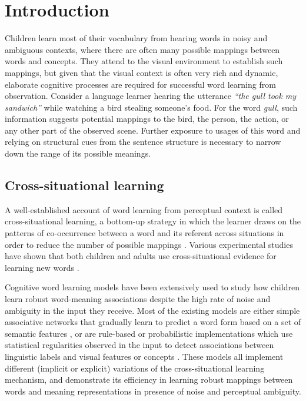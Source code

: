 \section{Introduction}

Children learn most of their vocabulary from hearing words in noisy
and ambiguous contexts, where there are often many possible mappings
between words and concepts. They attend to the visual environment to
establish such mappings, but given that the visual context is often
very rich and dynamic, elaborate cognitive processes are required for
successful word learning from observation. Consider a language learner
hearing the utterance {\it ``the gull took my sandwich''} while
watching a bird stealing someone's food. For the word {\it gull}, such
information suggests potential mappings to the bird, the person, the
action, or any other part of the observed scene. Further exposure to
usages of this word and relying on structural cues from the sentence structure
is necessary to narrow down the range of its possible meanings.

\subsection{Cross-situational learning}
A well-established account of word learning from perceptual context is
called cross-situational learning, a bottom-up strategy in which the
learner draws on the patterns of co-occurrence between a word and its
referent across situations in order to reduce the number of possible
mappings \citep{Quine1960,Carey1978,pinker.89}. Various experimental
studies have shown that both children and adults use cross-situational
evidence for learning new words
\citep{yu.smith.07,smith.yu.08,vouloumanos.08,vouloumanos.werker.09}.

Cognitive word learning models have been extensively used to study how
children learn robust word-meaning associations despite the high rate
of noise and ambiguity in the input they receive. Most of the existing
models are either simple associative networks that gradually learn to
predict a word form based on a set of semantic features
\citep{Li.etal.2004,regier.05}, or are rule-based or
probabilistic implementations which use statistical regularities
observed in the input to detect associations between linguistic labels
and visual features or concepts
\citep{siskind.96,frank.etal.07,yu.08,fazly.etal.10csj}.
These models all implement different (implicit or explicit) variations
of the cross-situational learning mechanism, and demonstrate its
efficiency in learning robust mappings between words and meaning
representations in presence of noise and perceptual ambiguity.

